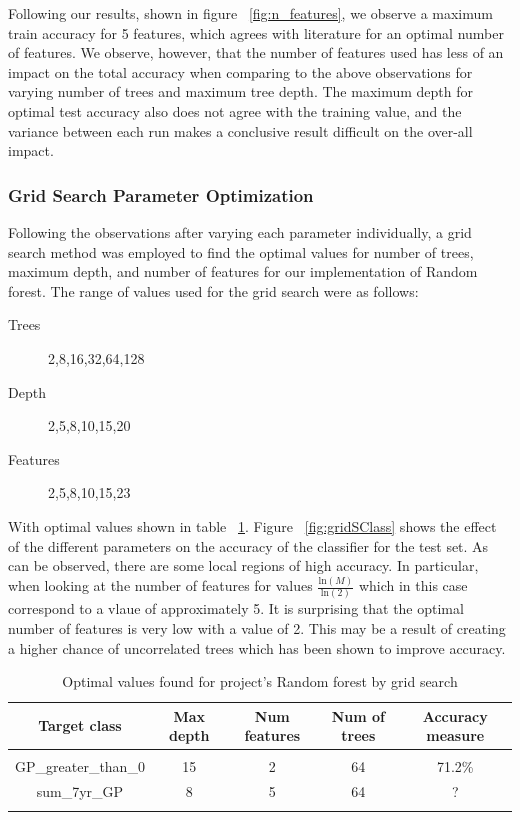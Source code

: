 \documentclass{article} %
\begin{document}
Following our results, shown in figure ~\ref{fig:n_features}, we observe a maximum train accuracy for 5 features, which agrees with literature for an optimal number of features. We observe, however, that the number of features used has less of an impact on the total accuracy when comparing to the above observations for varying number of trees and maximum tree depth. The maximum depth for optimal test accuracy also does not agree with the training value, and the variance between each run makes a conclusive result difficult on the over-all impact.  

\subsubsection{Grid Search Parameter Optimization}

Following the observations after varying each parameter individually, a grid search method was employed to find the optimal values for number of trees, maximum depth, and number of features for our implementation of Random forest. The range of values used for the grid search were as follows:

\begin{description}
\item [Trees] 2,8,16,32,64,128
\item [Depth] 2,5,8,10,15,20
\item [Features] 2,5,8,10,15,23
\end{description}

With optimal values shown in table ~\ref{opt-table}. Figure ~\ref{fig:gridSClass} shows the effect of the different parameters on the accuracy of the classifier for the test set. As can be observed, there are some local regions of high accuracy. In particular, when looking at the number of features for values $\frac{\text{ln}(M)}{\text{ln}(2)}$ which in this case correspond to a vlaue of approximately 5. It is surprising that the optimal number of features is very low with a value of 2. This may be a result of creating a higher chance of uncorrelated trees which has been shown to improve accuracy. \cite{Bharathidason2014}

\begin{table}[h]
\caption{Optimal values found for project's Random forest by grid search}
\begin{center}
\begin{tabular}{ccccc}
{\bf Target class} &{\bf Max depth} &{\bf Num features} &{\bf Num of trees}&{\bf Accuracy measure}
\\ \hline \\
GP\_greater\_than\_0         &15	&2	&64 &71.2\%\\
sum\_7yr\_GP         &8	&5	&64 &?\\
\label{opt-table}
\end{tabular}
\end{center}
\end{table}
\end{document}
